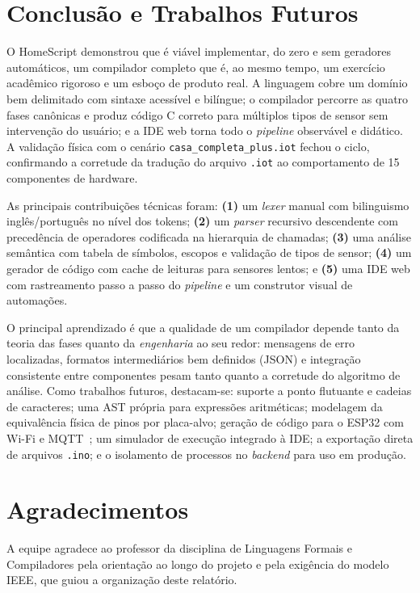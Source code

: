 \documentclass[conference]{IEEEtran}
\begin{document}
\section{Conclusão e Trabalhos Futuros}
\label{sec:conclusao}

O HomeScript demonstrou que é viável implementar, do zero e sem geradores
automáticos, um compilador completo que é, ao mesmo tempo, um exercício
acadêmico rigoroso e um esboço de produto real. A linguagem cobre um
domínio bem delimitado com sintaxe acessível e bilíngue; o compilador
percorre as quatro fases canônicas e produz código C correto para múltiplos
tipos de sensor sem intervenção do usuário; e a IDE web torna todo o
\emph{pipeline} observável e didático. A validação física com o cenário
\texttt{casa\_completa\_plus.iot} fechou o ciclo, confirmando a corretude
da tradução do arquivo \texttt{.iot} ao comportamento de 15 componentes de
hardware.

As principais contribuições técnicas foram: \textbf{(1)} um \emph{lexer}
manual com bilinguismo inglês/português no nível dos tokens; \textbf{(2)}
um \emph{parser} recursivo descendente com precedência de operadores
codificada na hierarquia de chamadas; \textbf{(3)} uma análise semântica
com tabela de símbolos, escopos e validação de tipos de sensor;
\textbf{(4)} um gerador de código com cache de leituras para sensores
lentos; e \textbf{(5)} uma IDE web com rastreamento passo a passo do
\emph{pipeline} e um construtor visual de automações.

O principal aprendizado é que a qualidade de um compilador depende tanto da
teoria das fases quanto da \emph{engenharia} ao seu redor: mensagens de
erro localizadas, formatos intermediários bem definidos (JSON) e integração
consistente entre componentes pesam tanto quanto a corretude do algoritmo
de análise. Como trabalhos futuros, destacam-se: suporte a ponto flutuante
e cadeias de caracteres; uma AST própria para expressões aritméticas;
modelagem da equivalência física de pinos por placa-alvo; geração de código
para o ESP32 com Wi-Fi e MQTT~\cite{mqtt2019}; um simulador de execução
integrado à IDE; a exportação direta de arquivos \texttt{.ino}; e o
isolamento de processos no \emph{backend} para uso em produção.

\section*{Agradecimentos}
A equipe agradece ao professor da disciplina de Linguagens Formais e
Compiladores pela orientação ao longo do projeto e pela exigência do modelo
IEEE, que guiou a organização deste relatório.
\end{document}
